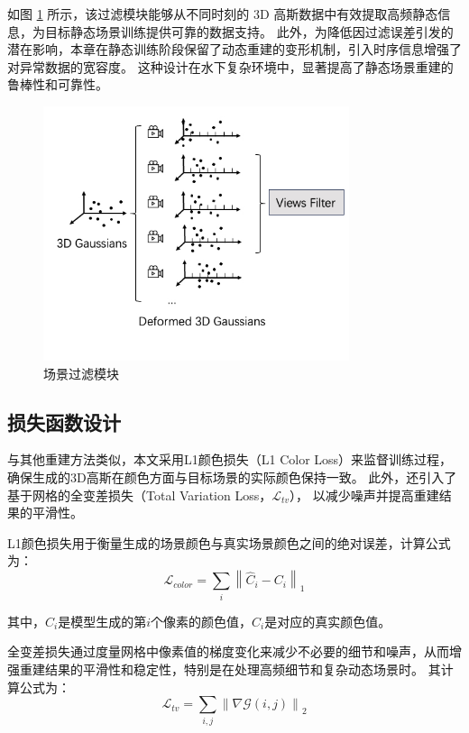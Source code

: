 如图 \ref{img:filter} 所示，该过滤模块能够从不同时刻的 3D 高斯数据中有效提取高频静态信息，为目标静态场景训练提供可靠的数据支持。
此外，为降低因过滤误差引发的潜在影响，本章在静态训练阶段保留了动态重建的变形机制，引入时序信息增强了对异常数据的宽容度。
这种设计在水下复杂环境中，显著提高了静态场景重建的鲁棒性和可靠性。
\begin{figure}
    \centering
    \includegraphics[width=0.8\textwidth]{figures/ch4/filter.jpg}
    \caption{场景过滤模块}
    \label{img:filter}
\end{figure}

\subsection{损失函数设计}
与其他重建方法类似\cite{3DGS}\cite{tineuvox}\cite{dnerf}，本文采用L1颜色损失（L1 Color Loss）来监督训练过程，
确保生成的3D高斯在颜色方面与目标场景的实际颜色保持一致。
此外，还引入了基于网格的全变差损失（Total Variation Loss，$\mathcal{L}_{tv}$），
以减少噪声并提高重建结果的平滑性。

L1颜色损失用于衡量生成的场景颜色与真实场景颜色之间的绝对误差，计算公式为：
\begin{equation}
    \mathcal{L}_{color} = \sum_{i} \left\| \hat{C}_i - C_i \right\|_1
\end{equation}

其中，$\hat{C}_i$是模型生成的第$i$个像素的颜色值，$C_i$是对应的真实颜色值。

全变差损失通过度量网格中像素值的梯度变化来减少不必要的细节和噪声，从而增强重建结果的平滑性和稳定性，特别是在处理高频细节和复杂动态场景时。
其计算公式为：
\begin{equation}
    \mathcal{L}_{tv} = \sum_{i,j} \left\| \nabla \mathcal{G}(i,j) \right\|_2
\end{equation}

